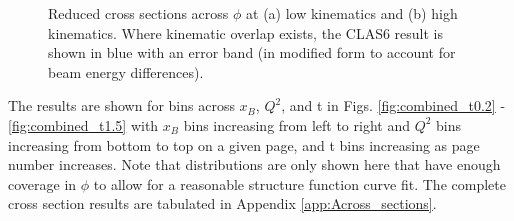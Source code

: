 \begin{figure}[H]
    \centering

    \hfill

    \caption[Reduced Cross Sections Across $\phi$]{Reduced cross sections across $\phi$ at (a) low kinematics and (b) high kinematics. Where kinematic overlap exists, the CLAS6 result \parencite{Bedlinskiy2014ExclusiveCLAS} is shown in blue with an error band (in modified form to account for beam energy differences). }\label{fig:redxsec_phi}
\end{figure}


The results are shown for bins across $x_B$, $Q^2$, and t in Figs. \ref{fig:combined_t0.2} - \ref{fig:combined_t1.5} with $x_B$ bins increasing from left to right and $Q^2$ bins increasing from bottom to top on a given page, and t bins increasing as page number increases. Note that distributions are only shown here that have enough coverage in $\phi$ to allow for a reasonable structure function curve fit. The complete cross section results are tabulated in Appendix \ref{app:Across_sections}.

